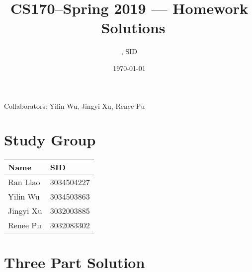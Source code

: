 \documentclass[11pt]{article}
\title{CS170--Spring 2019 --- Homework \Homework\ Solutions}
\author{\Name, SID \SID}
\date{\today}
\begin{document}
\maketitle
Collaborators: Yilin Wu, Jingyi Xu, Renee Pu

\section{Study Group}
\begin{tabular}{ll}
    Name        &   SID         \\\hline
    Ran Liao    &   3034504227  \\  
    Yilin Wu    &   3034503863  \\
    Jingyi Xu   &   3032003885  \\
    Renee Pu    &   3032083302  \\
\end{tabular}



\newpage
\section{Three Part Solution}

\newpage
\end{document}
